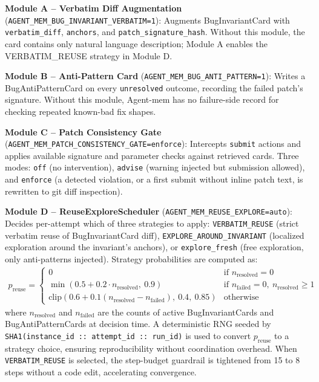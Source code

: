 \documentclass[runningheads]{llncs}
\begin{document}
\textbf{Module A -- Verbatim Diff Augmentation} (\texttt{AGENT\_MEM\_BUG\_INVARIANT\_VERBATIM=1}): Augments BugInvariantCard with \texttt{verbatim\_diff}, \texttt{anchors}, and \texttt{patch\_signature\_hash}. Without this module, the card contains only natural language description; Module A enables the VERBATIM\_REUSE strategy in Module D.

\textbf{Module B -- Anti-Pattern Card} (\texttt{AGENT\_MEM\_BUG\_ANTI\_PATTERN=1}): Writes a BugAntiPatternCard on every \texttt{unresolved} outcome, recording the failed patch's signature. Without this module, Agent-mem has no failure-side record for checking repeated known-bad fix shapes.

\textbf{Module C -- Patch Consistency Gate} (\texttt{AGENT\_MEM\_PATCH\_CONSISTENCY\_GATE=enforce}): Intercepts \texttt{submit} actions and applies available signature and parameter checks against retrieved cards. Three modes: \texttt{off} (no intervention), \texttt{advise} (warning injected but submission allowed), and \texttt{enforce} (a detected violation, or a first submit without inline patch text, is rewritten to git diff inspection).

\textbf{Module D -- ReuseExploreScheduler} (\texttt{AGENT\_MEM\_REUSE\_EXPLORE=auto}): Decides per-attempt which of three strategies to apply: \texttt{VERBATIM\_REUSE} (strict verbatim reuse of BugInvariantCard diff), \texttt{EXPLORE\_AROUND\_INVARIANT} (localized exploration around the invariant's anchors), or \texttt{explore\_fresh} (free exploration, only anti-patterns injected). Strategy probabilities are computed as:
\begin{align}
p_{\text{reuse}} = \begin{cases}
0 & \text{if } n_{\text{resolved}} = 0 \\
\min(0.5 + 0.2 \cdot n_{\text{resolved}},\ 0.9) & \text{if } n_{\text{failed}} = 0,\ n_{\text{resolved}} \geq 1 \\
\text{clip}(0.6 + 0.1(n_{\text{resolved}} - n_{\text{failed}}),\ 0.4,\ 0.85) & \text{otherwise}
\end{cases}
\end{align}
where $n_{\text{resolved}}$ and $n_{\text{failed}}$ are the counts of active BugInvariantCards and BugAntiPatternCards at decision time. A deterministic RNG seeded by \texttt{SHA1(instance\_id :: attempt\_id :: run\_id)} is used to convert $p_{\text{reuse}}$ to a strategy choice, ensuring reproducibility without coordination overhead. When \texttt{VERBATIM\_REUSE} is selected, the step-budget guardrail is tightened from 15 to 8 steps without a code edit, accelerating convergence.
\end{document}

